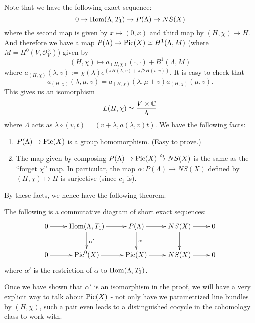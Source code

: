 Note that we have the following exact sequence:
$$0\to \operatorname{Hom}(\Lambda,T_1)\to P(\Lambda)\to NS(X)$$
where the second map is given by $x\mapsto (0,x)$ and third map by $(H,\chi)\mapsto H$. And therefore we have a map $P(\Lambda)\to \operatorname{Pic}(X)\simeq H^1(\Lambda,M)$ (where $M=H^0(V,\mathcal{O}^\times_V)$) given by
$$(H,\chi)\mapsto a_{(H,\chi)}(\cdot,\cdot)+B^1(\Lambda,M)$$
where $a_{(H,\chi)}(\lambda,v):=\chi(\lambda)e^{(\pi H(\lambda,v)+\pi/2 H(v,v))}$. It is easy to check that 
$$a_{(H,\chi)}(\lambda,\mu,v)=a_{(H,\chi)}(\lambda,\mu+v)a_{(H,\chi)}(\mu,v).$$ 
This gives us an isomorphism 
$$L(H,\chi)\simeq \frac{V\times {\mathbb C}}{\Lambda}$$
where $\Lambda$ acts as $\lambda\circ (v,t)=(v+\lambda,a(\lambda,v)t)$. We have the following facts:

\begin{enumerate}
\item $P(\Lambda)\to \operatorname{Pic}(X)$ is a group homomorphism. (Easy to prove.)
\item The map given by composing $P(\Lambda)\to \operatorname{Pic}(X) \overset{c_1}{\to} NS(X)$ is the same as the ``forget $\chi$'' map. In particular, the map $\alpha:P(\Lambda)\to NS(X)$ defined by $(H,\chi)\mapsto H$ is surjective (since $c_1$ is). 
\end{enumerate}

By these facts, we hence have the following theorem.

\begin{theorem}
The following is a commutative diagram of short exact sequences:
\[
\xymatrix{
0 \ar[r] &\Hom(\Lambda,T_1) \ar[r] \ar[d]^{\alpha'} &P(\Lambda) \ar[r] \ar[d]^{\alpha} &NS(X) \ar[r] \ar[d]^= &0\\
0 \ar[r] &\Pic^0(X) \ar[r] &\Pic(X) \ar[r] &NS(X) \ar[r] &0
}
\]
where $\alpha'$ is the restriction of $\alpha$ to $\operatorname{Hom}(\Lambda,T_1)$. 
\end{theorem}

Once we have shown that $\alpha'$ is an isomorphism in the proof, we will have a very explicit way to talk about $\operatorname{Pic}(X)$ - not only have we parametrized line bundles by $(H,\chi)$, such a pair even leads to a distinguished cocycle in the cohomology class to work with.



